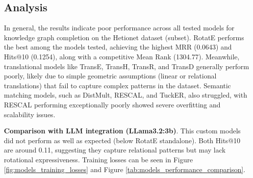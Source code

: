 \subsection*{Analysis}
In general, the results indicate poor performance across all tested models for knowledge graph completion on the Hetionet dataset (subset). RotatE performs the best among the models tested, achieving the highest MRR (0.0643) and Hits@10 (0.1254), along with a competitive Mean Rank (1304.77). Meanwhile, translational models like TransE, TransH, TransR, and TransD generally perform poorly, likely due to simple geometric assumptions (linear or relational translations) that fail to capture complex patterns in the dataset. Semantic matching models, such as DistMult, RESCAL, and TuckER, also struggled, with RESCAL performing exceptionally poorly showed severe overfitting and scalability issues. 

\textbf{Comparison with LLM integration (LLama3.2:3b)}. This custom models did not perform as well as expected (below RotatE standalone). Both Hits@10 are around 0.11, suggesting they capture relational patterns but may lack rotational expressiveness. Training losses can be seen in Figure \ref{fig:models_training_losses} and Figure \ref{tab:models_performance_comparison}.




%
%
%

